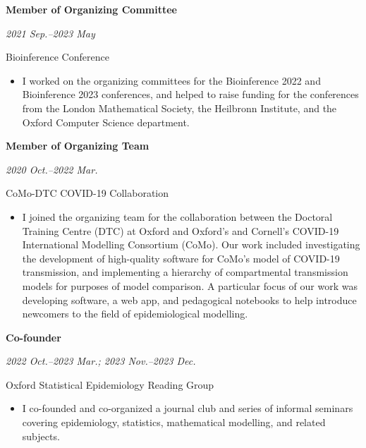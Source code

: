 \documentclass[10pt]{article}
\begin{document}
\vspace{0.2cm}









\noindent\parbox{.65\textwidth}{\raggedright  \textbf{Member of Organizing Committee}}
\parbox{.35\textwidth}{\raggedleft \emph{2021 Sep.--2023 May}}
Bioinference Conference
\vspace{-.2cm}
\begin{itemize}
\setlength{\itemsep}{0pt}
\item I worked on the organizing committees for the Bioinference 2022 and Bioinference 2023 conferences, and helped to raise funding for the conferences from the London Mathematical Society, the Heilbronn Institute, and the Oxford Computer Science department.
\end{itemize}


\vspace{0.2cm}



\noindent\parbox{.65\textwidth}{\raggedright  \textbf{Member of Organizing Team}}
\parbox{.35\textwidth}{\raggedleft \emph{2020 Oct.--2022 Mar.}}
CoMo-DTC COVID-19 Collaboration 
\vspace{-.2cm}
\begin{itemize}
\setlength{\itemsep}{0pt}
\item I joined the organizing team for the collaboration between the Doctoral Training Centre (DTC) at Oxford and Oxford's and Cornell's COVID-19 International Modelling Consortium (CoMo). Our work included investigating the development of high-quality software for CoMo's model of COVID-19 transmission, and implementing a hierarchy of compartmental transmission models for purposes of model comparison. A particular focus of our work was developing software, a web app, and pedagogical notebooks to help introduce newcomers to the field of epidemiological modelling.
\end{itemize}

\vspace{0.2cm}


\noindent\parbox{.65\textwidth}{\raggedright  \textbf{Co-founder}}
\parbox{.35\textwidth}{\raggedleft \emph{2022 Oct.--2023 Mar.; 2023 Nov.--2023 Dec.}}
Oxford Statistical Epidemiology Reading Group
\vspace{-.2cm}
\begin{itemize}
\setlength{\itemsep}{0pt}
\item I co-founded and co-organized a journal club and series of informal seminars covering epidemiology, statistics, mathematical modelling, and related subjects.
\end{itemize}
\end{document}
